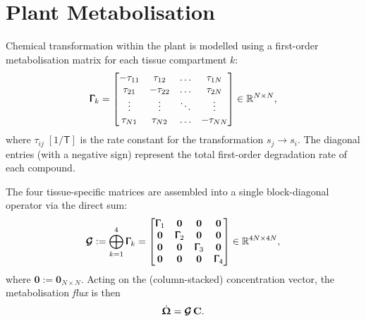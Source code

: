 \documentclass[12pt,a4paper]{article}
\newcommand{\R}{\mathbb{R}}
\newcommand{\dT}{\mathsf{T}}
\begin{document}
\section{Plant Metabolisation}\label{sec:metabolism}

Chemical transformation within the plant is modelled using a first-order metabolisation matrix for each tissue compartment $k$:
\begin{equation}\label{eq:gamma}
    \bm{\Upgamma}_k = 
    \begin{bmatrix}
        -\tau_{11} & \tau_{12} & \dots & \tau_{1N} \\
        \tau_{21} & -\tau_{22} & \dots & \tau_{2N} \\
        \vdots & \vdots & \ddots & \vdots \\
        \tau_{N1} & \tau_{N2} & \dots & -\tau_{NN}
    \end{bmatrix}\in \R^{N\times N},
\end{equation}
where $\tau_{ij}\;[1/\dT]$ is the rate constant for the transformation $s_j \rightarrow s_i$.  The diagonal entries (with a negative sign) represent the total first-order degradation rate of each compound.

The four tissue-specific matrices are assembled into a single block-diagonal operator via the direct sum:
\begin{equation}\label{eq:bigG}
    \bm{\mathcal{G}} := \bigoplus_{k=1}^{4}\bm{\Upgamma}_k=
    \begin{bmatrix}
        \bm{\Upgamma}_1 & \mathbf{0} & \mathbf{0} & \mathbf{0} \\
        \mathbf{0} & \bm{\Upgamma}_2 & \mathbf{0} & \mathbf{0} \\
        \mathbf{0} & \mathbf{0} & \bm{\Upgamma}_3 & \mathbf{0} \\
        \mathbf{0} & \mathbf{0} & \mathbf{0} & \bm{\Upgamma}_4
    \end{bmatrix}\in \R^{4N \times 4N},
\end{equation}
where $\mathbf{0}:= \mathbf{0}_{N \times N}$.  Acting on the (column-stacked) concentration vector, the metabolisation \emph{flux} is then
\begin{equation}\label{eq:omega}
    \dot{\bm{\Upomega}} = \bm{\mathcal{G}}\,\mathbf{C}.
\end{equation}


\end{document}
